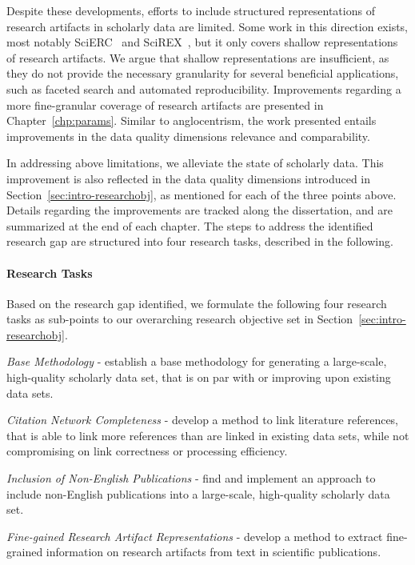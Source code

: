 \begin{enumerate}
Despite these developments, efforts to include structured representations of research artifacts in scholarly data are limited. Some work in this direction exists, most notably SciERC~\cite{luan2018scierc} and SciREX~\cite{Jain2020scirex}, but it only covers shallow representations of research artifacts.
We argue that shallow representations are insufficient, as they do not provide the necessary granularity for several beneficial applications, such as faceted search and automated reproducibility.
Improvements regarding a more fine-granular coverage of research artifacts are presented in Chapter~\ref{chp:params}. Similar to anglocentrism, the work presented entails improvements in the data quality dimensions relevance and comparability.
\end{enumerate}

In addressing above limitations, we alleviate the state of scholarly data. This improvement is also reflected in the data quality dimensions introduced in Section~\ref{sec:intro-researchobj}, as mentioned for each of the three points above. Details regarding the improvements are tracked along the dissertation, and are summarized at the end of each chapter. The steps to address the identified research gap are structured into four research tasks, described in the following.

\paragraph{Research Tasks}
Based on the research gap identified, we formulate the following four research tasks as sub-points to our overarching research objective set in Section~\ref{sec:intro-researchobj}.

\begin{rtlist}
    \item \textit{Base Methodology} - establish a base methodology for generating a large-scale, high-quality scholarly data set, that is on par with or improving upon existing data sets.
    \item \textit{Citation Network Completeness} - develop a method to link literature references, that is able to link more references than are linked in existing data sets, while not compromising on link correctness or processing efficiency.
    \item \textit{Inclusion of Non-English Publications} - find and implement an approach to include non-English publications into a large-scale, high-quality scholarly data set.
    \item \textit{Fine-gained Research Artifact Representations} - develop a method to extract fine-grained information on research artifacts from text in scientific publications.
\end{rtlist}

